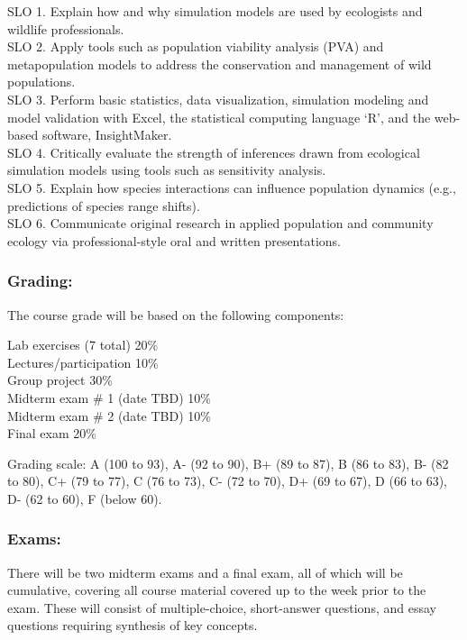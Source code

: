 \documentclass[
]{article}
\begin{document}
SLO 1. Explain how and why simulation models are used by ecologists and
wildlife professionals.\\
SLO 2. Apply tools such as population viability analysis (PVA) and
metapopulation models to address the conservation and management of wild
populations.\\
SLO 3. Perform basic statistics, data visualization, simulation modeling
and model validation with Excel, the statistical computing language `R',
and the web-based software, InsightMaker.\\
SLO 4. Critically evaluate the strength of inferences drawn from
ecological simulation models using tools such as sensitivity analysis.\\
SLO 5. Explain how species interactions can influence population
dynamics (e.g., predictions of species range shifts).\\
SLO 6. Communicate original research in applied population and community
ecology via professional-style oral and written presentations.

\subsubsection{Grading:}\label{grading}

The course grade will be based on the following components:

Lab exercises (7 total) 20\%\\
Lectures/participation 10\%\\
Group project 30\%\\
Midterm exam \# 1 (date TBD) 10\%\\
Midterm exam \# 2 (date TBD) 10\%\\
Final exam 20\%

Grading scale: A (100 to 93), A- (92 to 90), B+ (89 to 87), B (86 to
83), B- (82 to 80), C+ (79 to 77), C (76 to 73), C- (72 to 70), D+ (69
to 67), D (66 to 63), D- (62 to 60), F (below 60).

\subsubsection{Exams:}\label{exams}

There will be two midterm exams and a final exam, all of which will be
cumulative, covering all course material covered up to the week prior to
the exam. These will consist of multiple-choice, short-answer questions,
and essay questions requiring synthesis of key concepts.
\end{document}
